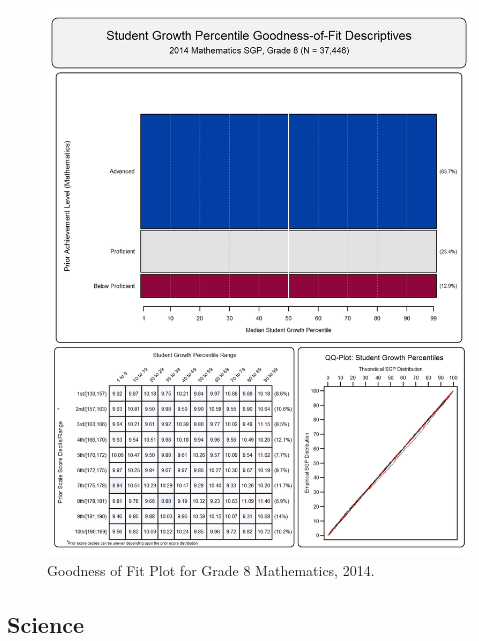 \documentclass[12pt]{article}
\begin{document}
\begin{figure}[htbp]
\centering
\includegraphics{../img/Goodness_of_Fit/MATHEMATICS.2014/2014_MATH_8;2013_MATH_7;2012_MATH_6;2011_MATH_5;2010_MATH_4;2009_MATH_3.png}
\caption{Goodness of Fit Plot for Grade 8 Mathematics, 2014.}
\end{figure}

\clearpage 

\subsection{Science}\label{science}
\end{document}
